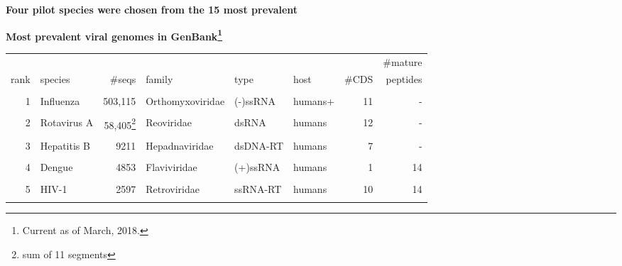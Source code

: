 \documentclass[landscape]{slides}
\begin{document}
\begin{slide}
\begin{center}

\textbf{Four pilot species were chosen from the 15 most prevalent}

\textbf{Most prevalent viral genomes in GenBank\footnote{Current as of March, 2018.}}


\tiny
\begin{tabular}{r|l|r|l|l|l|r|r}
     &                     &              &                &          &        &       & \#mature \\ 
rank & species             & \#seqs       & family         & type     & host   &  \#CDS& peptides \\ \hline
     &                     &              &                &          &        &       &          \\ 
  1  & Influenza           &   503,115    & Orthomyxoviridae& (-)ssRNA& humans+&    11 & -        \\ %
     &                     &              &                &          &        &       &          \\ 
  2  & Rotavirus A         &58,405\footnote{sum of 11 segments}& Reoviridae&dsRNA&humans&   12 & -\\ %
     &                     &              &                &          &        &       &          \\ 
  \textcolor{myorange}{3}  & \textcolor{myorange}{Hepatitis B}         &         \textcolor{myorange}{9211} & \textcolor{myorange}{Hepadnaviridae} & \textcolor{myorange}{dsDNA-RT} & \textcolor{myorange}{humans} &     \textcolor{myorange}{7} & \textcolor{myorange}{-}        \\ %
     &                     &              &                &          &        &       &          \\ 
  \textcolor{myorange}{4}  & \textcolor{myorange}{Dengue}              &         \textcolor{myorange}{4853} & \textcolor{myorange}{Flaviviridae}   & \textcolor{myorange}{(+)ssRNA} & \textcolor{myorange}{humans} &     \textcolor{myorange}{1} & \textcolor{myorange}{14}       \\ %
     &                     &              &                &          &        &       &          \\ 
  5  & HIV-1               &        2597  & Retroviridae   & ssRNA-RT & humans &    10 & 14       \\ %
     &                     &              &                &          &        &       &          \\ 

\end{tabular}
\end{center}
\end{slide}
\end{document}
